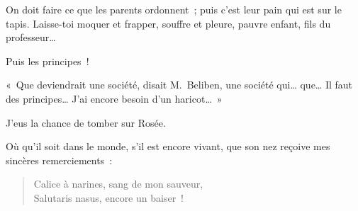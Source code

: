 \documentclass[french,twoside]{book} %
\begin{document}
On doit faire ce que les parents ordonnent ; puis c’est leur pain qui est sur le tapis. Laisse-toi moquer et frapper, souffre et pleure, pauvre enfant, fils du professeur…\par
\bigbreak
\noindent Puis les principes !\par
« Que deviendrait une société, disait M. Beliben, une société qui… que… Il faut des principes… J’ai encore besoin d’un haricot… »\par
J’eus la chance de tomber sur Rosée.\par
Où qu’il soit dans le monde, s’il est encore vivant, que son nez reçoive mes sincères remerciements :\par


\begin{verse}
Calice à narines, sang de mon sauveur,\\
Salutaris nasus, encore un baiser !\\
\end{verse}
\end{document}
